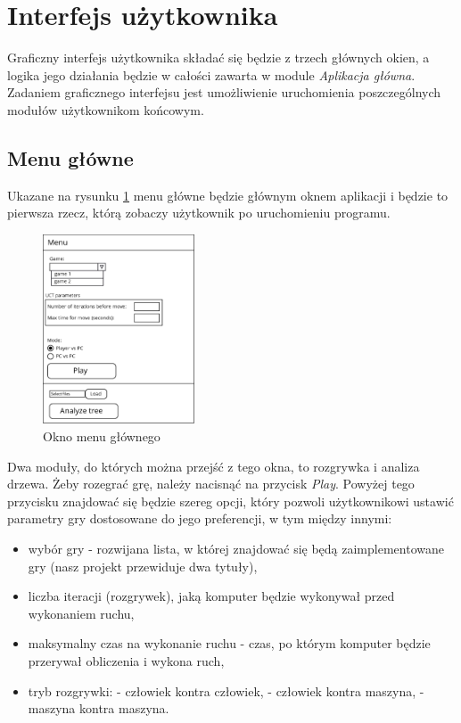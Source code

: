 \documentclass{article}
\let\oldsection\section
\renewcommand\section{\clearpage\oldsection}
\newcommand{\modulename}[1]{\textit{#1}}
\begin{document}
	\section{Interfejs użytkownika}
	Graficzny interfejs użytkownika składać się będzie z trzech głównych okien, a logika jego działania będzie w całości zawarta w module \modulename{Aplikacja główna}. Zadaniem graficznego interfejsu jest umożliwienie uruchomienia poszczególnych modułów użytkownikom końcowym.
	
	\subsection{Menu główne}
	Ukazane na rysunku \ref{rys:main_menu} menu główne będzie głównym oknem aplikacji i będzie to pierwsza rzecz, którą zobaczy użytkownik po uruchomieniu programu.
	\begin{figure}[h!]
		\centering
		\includegraphics[width=0.4\textwidth]{menu-eps-improved}
		\caption{Okno menu głównego}
		\label{rys:main_menu}
	\end{figure}

	\noindent Dwa moduły, do których można przejść z tego okna, to rozgrywka i analiza drzewa.	Żeby rozegrać grę, należy nacisnąć na przycisk \textit{Play}. Powyżej tego przycisku znajdować się będzie szereg opcji, który pozwoli użytkownikowi ustawić parametry gry dostosowane do jego preferencji, w tym między innymi:\\
	
	\begin{itemize}
		\item wybór gry - rozwijana lista, w której znajdować się będą zaimplementowane gry (nasz projekt przewiduje dwa tytuły),
		\item liczba iteracji (rozgrywek), jaką komputer będzie wykonywał przed wykonaniem ruchu,
		\item maksymalny czas na wykonanie ruchu - czas, po którym komputer będzie przerywał obliczenia i wykona ruch,
		\item tryb rozgrywki:
		\subitem - człowiek kontra człowiek,
		\subitem - człowiek kontra maszyna,
		\subitem - maszyna kontra maszyna.\\
	\end{itemize}
\end{document}
